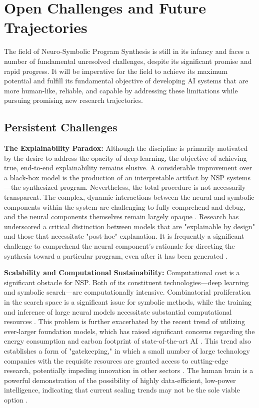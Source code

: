 \documentclass[12pt, a4paper]{report}
\begin{document}
\section{Open Challenges and Future Trajectories}

The field of Neuro-Symbolic Program Synthesis is still in its infancy and faces a number of fundamental unresolved challenges, despite its significant promise and rapid progress. It will be imperative for the field to achieve its maximum potential and fulfill its fundamental objective of developing AI systems that are more human-like, reliable, and capable by addressing these limitations while pursuing promising new research trajectories.

\subsection{Persistent Challenges}
\textbf{The Explainability Paradox:} Although the discipline is primarily motivated by the desire to address the opacity of deep learning, the objective of achieving true, end-to-end explainability remains elusive. A considerable improvement over a black-box model is the production of an interpretable artifact by NSP systems—the synthesized program. Nevertheless, the total procedure is not necessarily transparent. The complex, dynamic interactions between the neural and symbolic components within the system are challenging to fully comprehend and debug, and the neural components themselves remain largely opaque \citep{zhang2020survey}. Research has underscored a critical distinction between models that are "explainable by design" and those that necessitate "post-hoc" explanation. It is frequently a significant challenge to comprehend the neural component's rationale for directing the synthesis toward a particular program, even after it has been generated \citep{zhang2020survey}.

\textbf{Scalability and Computational Sustainability:} Computational cost is a significant obstacle for NSP. Both of its constituent technologies—deep learning and symbolic search—are computationally intensive. Combinatorial proliferation in the search space is a significant issue for symbolic methods, while the training and inference of large neural models necessitate substantial computational resources \citep{zhang2019raven}. This problem is further exacerbated by the recent trend of utilizing ever-larger foundation models, which has raised significant concerns regarding the energy consumption and carbon footprint of state-of-the-art AI \citep{zhang2018neural}. This trend also establishes a form of "gatekeeping," in which a small number of large technology companies with the requisite resources are granted access to cutting-edge research, potentially impeding innovation in other sectors \citep{zhang2018neural}. The human brain is a powerful demonstration of the possibility of highly data-efficient, low-power intelligence, indicating that current scaling trends may not be the sole viable option \citep{zhang2018neural}.
\end{document}
